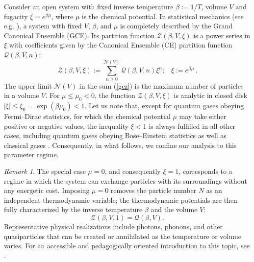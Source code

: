 \documentclass[a4paper,12pt]{amsart}
\theoremstyle{definition}
\theoremstyle{remark}
\newtheorem{Remark}{Remark}[section]
\begin{document}
Consider an open system with fixed inverse temperature $\beta:=1/T$, volume $V$ and fugacity  $\xi=e^{\beta\mu}$, where $\mu$ is the chemical potential. In statistical mechanics (see e.g. \cite{Hill, Lanlif, BlanTh}), a system with fixed $V$, $\beta$, and $\mu$ is completely described by the Grand Canonical Ensemble (GCE). Its partition function $\mathcal{Z}(\beta, V,\xi)$ is a power series in  $\xi$ with coefficients given by the Canonical Ensemble (CE) partition function $\mathcal{Q}(\beta, V, n)$:
\begin{equation} \label{gcz}
 \mathcal{Z}(\beta,V,\xi):= \sum_{n\geq 0}^{\mathcal{N}(V)}\mathcal{Q}(\beta, V,n) \xi^n;\;\;\; \xi:=e^{\beta\mu} \,.
\end{equation}
The upper limit $\mathcal{N}(V)$ in the sum (\ref{gcz}) is the maximum number of particles in a volume $V$. For $\mu\leq \mu_0<0$, the function $\mathcal{Z}(\beta, V,\xi)$ is analytic in closed disk $|\xi|\leq\xi_0 =\exp(\beta\mu_0)<1$. Let us note that, except for  quantum gases obeying Fermi–Dirac statistics, for which the chemical potential $\mu$ may take either positive or negative values, the inequality $\xi < 1$ is always fulfilled in all other cases, including quantum gases obeying Bose–Einstein statistics as well as classical gases \cite{Lanlif}. Consequently, in what follows, we confine our analysis to this parameter regime.

\begin{Remark}
 The special case $\mu = 0$, and consequently $\xi = 1$, corresponds to a regime in which the system can exchange particles with its surroundings without any energetic cost. Imposing $\mu = 0$ removes the particle number $N$ as an independent thermodynamic variable; the thermodynamic potentials are then fully characterized by the inverse temperature $\beta$ and the volume $V$:
\[
\mathcal{Z}(\beta, V, 1) = \mathcal{Q}(\beta, V).
\]
Representative physical realizations include photons, phonons, and other quasiparticles that can be created or annihilated as the temperature or volume varies. For an accessible and pedagogically oriented introduction to this topic, see \cite{Blaschke2026}.
\end{Remark}
\end{document}
